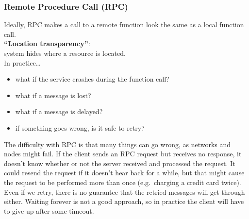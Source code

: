 \begin{frame}
    \label{s:rpc-problems}
    \frametitle{Remote Procedure Call (RPC)}
    Ideally, RPC makes a call to a remote function look the same as a local function call.\\[1em]
    \textbf{``Location transparency''}:\\ system hides where a resource is located.\\[1em]\pause
    In practice\dots
    \begin{itemize}
        \item what if the service crashes during the function call?
        \item what if a message is lost?
        \item what if a message is delayed?
        \item if something goes wrong, is it safe to retry?
    \end{itemize}
\end{frame}

The difficulty with RPC is that many things can go wrong, as networks and nodes might fail.
If the client sends an RPC request but receives no response, it doesn't know whether or not the server received and processed the request.
It could resend the request if it doesn't hear back for a while, but that might cause the request to be performed more than once (e.g.\ charging a credit card twice).
Even if we retry, there is no guarantee that the retried messages will get through either.
Waiting forever is not a good approach, so in practice the client will have to give up after some timeout.

